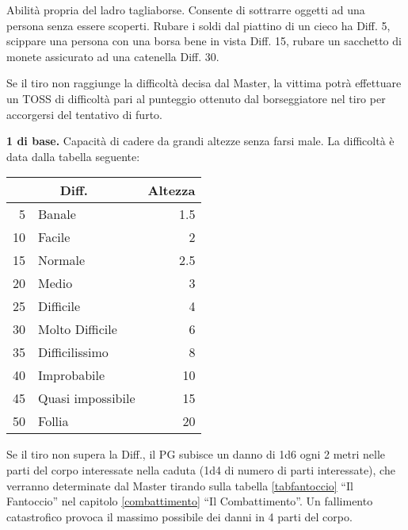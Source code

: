 Abilit\`a propria del ladro tagliaborse.
Consente di sottrarre oggetti ad una persona senza essere scoperti.
Rubare i soldi dal piattino di un cieco ha Diff. 5, scippare una
persona con una borsa bene in vista Diff. 15, rubare un sacchetto di
monete assicurato ad una catenella Diff. 30.

Se il tiro non raggiunge la difficolt\`a decisa dal Master, la vittima
potr\`a effettuare un TOSS di difficolt\`a pari al punteggio ottenuto
dal borseggiatore nel tiro per accorgersi del tentativo di furto.



 \textbf{1 di base.} Capacit\`a di cadere da
grandi altezze senza farsi male. La difficolt\`a \`e data dalla
tabella seguente:

\smallskip
\begin{center}
  \begin{tabular}{|rl|r@{ metri }|}
    \hline
    \multicolumn{2}{|c|}{Diff.}& Altezza \\ \hline\hline
    5& Banale& 1.5 \\ \hline
    10& Facile& 2 \\ \hline
    15& Normale & 2.5 \\ \hline
    20& Medio& 3 \\ \hline
    25& Difficile& 4\\ \hline
    30& Molto Difficile& 6\\ \hline
    35& Difficilissimo& 8 \\ \hline
    40& Improbabile& 10\\ \hline
    45& Quasi impossibile& 15 \\ \hline
    50& Follia& 20  \\ \hline
  \end{tabular}
\end{center}
\smallskip

Se il tiro non supera la Diff., il PG subisce un danno di 1d6
ogni 2 metri nelle parti del corpo interessate nella caduta (1d4 di
numero di parti interessate), che verranno determinate dal Master
tirando sulla tabella \ref{tabfantoccio} ``Il Fantoccio'' nel capitolo
\ref{combattimento} ``Il Combattimento''. Un fallimento catastrofico
provoca il massimo possibile dei danni in 4 parti del corpo.

